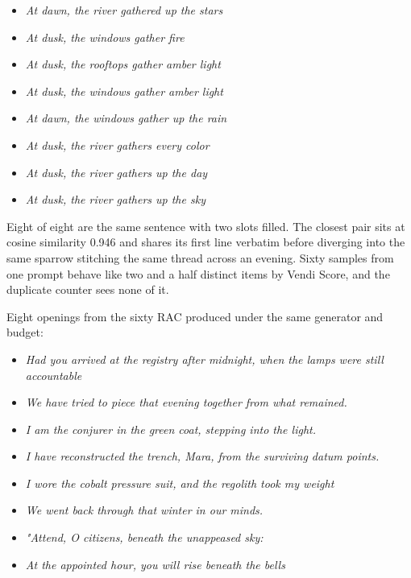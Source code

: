 \documentclass[
  10pt,
]{article}
\providecommand{\tightlist}{%
  \setlength{\itemsep}{0pt}\setlength{\parskip}{0pt}}
\theoremstyle{plain}
\theoremstyle{definition}
\providecommand{\tightlist}{\setlength{\itemsep}{0pt}\setlength{\parskip}{0pt}}
\begin{document}
\begin{itemize}
\tightlist
\item
  \emph{At dawn, the river gathered up the stars}
\item
  \emph{At dusk, the windows gather fire}
\item
  \emph{At dusk, the rooftops gather amber light}
\item
  \emph{At dusk, the windows gather amber light}
\item
  \emph{At dawn, the windows gather up the rain}
\item
  \emph{At dusk, the river gathers every color}
\item
  \emph{At dusk, the river gathers up the day}
\item
  \emph{At dusk, the river gathers up the sky}
\end{itemize}

Eight of eight are the same sentence with two slots filled. The closest
pair sits at cosine similarity 0.946 and shares its first line verbatim
before diverging into the same sparrow stitching the same thread across
an evening. Sixty samples from one prompt behave like two and a half
distinct items by Vendi Score, and the duplicate counter sees none of
it.

Eight openings from the sixty RAC produced under the same generator and
budget:

\begin{itemize}
\tightlist
\item
  \emph{Had you arrived at the registry after midnight, when the lamps
  were still accountable}
\item
  \emph{We have tried to piece that evening together from what
  remained.}
\item
  \emph{I am the conjurer in the green coat, stepping into the light.}
\item
  \emph{I have reconstructed the trench, Mara, from the surviving datum
  points.}
\item
  \emph{I wore the cobalt pressure suit, and the regolith took my
  weight}
\item
  \emph{We went back through that winter in our minds.}
\item
  \emph{"Attend, O citizens, beneath the unappeased sky:}
\item
  \emph{At the appointed hour, you will rise beneath the bells}
\end{itemize}
\end{document}
